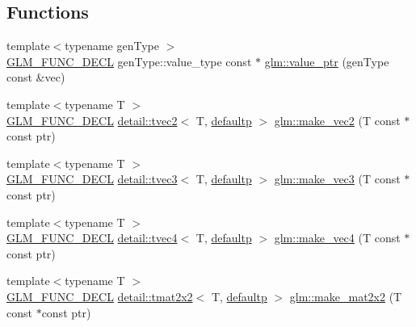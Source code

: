 \subsection*{Functions}
\begin{DoxyCompactItemize}
\item 
{\footnotesize template$<$typename gen\+Type $>$ }\\\hyperlink{setup_8hpp_ab2d052de21a70539923e9bcbf6e83a51}{G\+L\+M\+\_\+\+F\+U\+N\+C\+\_\+\+D\+E\+CL} gen\+Type\+::value\+\_\+type const  $\ast$ \hyperlink{group__gtc__type__ptr_gaf019636bb8bd7c9efb7c7ce3bb23bcfc}{glm\+::value\+\_\+ptr} (gen\+Type const \&vec)
\item 
{\footnotesize template$<$typename T $>$ }\\\hyperlink{setup_8hpp_ab2d052de21a70539923e9bcbf6e83a51}{G\+L\+M\+\_\+\+F\+U\+N\+C\+\_\+\+D\+E\+CL} \hyperlink{structglm_1_1detail_1_1tvec2}{detail\+::tvec2}$<$ T, \hyperlink{namespaceglm_a0f04f086094c747d227af4425893f545a9d21ccd8b5a009ec7eb7677befc3bf51}{defaultp} $>$ \hyperlink{group__gtc__type__ptr_ga70f570befb4773ba3a658b76f9fdd6ab}{glm\+::make\+\_\+vec2} (T const $\ast$const ptr)
\item 
{\footnotesize template$<$typename T $>$ }\\\hyperlink{setup_8hpp_ab2d052de21a70539923e9bcbf6e83a51}{G\+L\+M\+\_\+\+F\+U\+N\+C\+\_\+\+D\+E\+CL} \hyperlink{structglm_1_1detail_1_1tvec3}{detail\+::tvec3}$<$ T, \hyperlink{namespaceglm_a0f04f086094c747d227af4425893f545a9d21ccd8b5a009ec7eb7677befc3bf51}{defaultp} $>$ \hyperlink{group__gtc__type__ptr_gad91a6a0fe324630b151208703a1591ed}{glm\+::make\+\_\+vec3} (T const $\ast$const ptr)
\item 
{\footnotesize template$<$typename T $>$ }\\\hyperlink{setup_8hpp_ab2d052de21a70539923e9bcbf6e83a51}{G\+L\+M\+\_\+\+F\+U\+N\+C\+\_\+\+D\+E\+CL} \hyperlink{structglm_1_1detail_1_1tvec4}{detail\+::tvec4}$<$ T, \hyperlink{namespaceglm_a0f04f086094c747d227af4425893f545a9d21ccd8b5a009ec7eb7677befc3bf51}{defaultp} $>$ \hyperlink{group__gtc__type__ptr_ga1b9e0d9ca48d79ba87edc121c1872c44}{glm\+::make\+\_\+vec4} (T const $\ast$const ptr)
\item 
{\footnotesize template$<$typename T $>$ }\\\hyperlink{setup_8hpp_ab2d052de21a70539923e9bcbf6e83a51}{G\+L\+M\+\_\+\+F\+U\+N\+C\+\_\+\+D\+E\+CL} \hyperlink{structglm_1_1detail_1_1tmat2x2}{detail\+::tmat2x2}$<$ T, \hyperlink{namespaceglm_a0f04f086094c747d227af4425893f545a9d21ccd8b5a009ec7eb7677befc3bf51}{defaultp} $>$ \hyperlink{group__gtc__type__ptr_ga860d529f631ea6f9a0e510491d29a8ac}{glm\+::make\+\_\+mat2x2} (T const $\ast$const ptr)

\end{DoxyCompactItemize}

